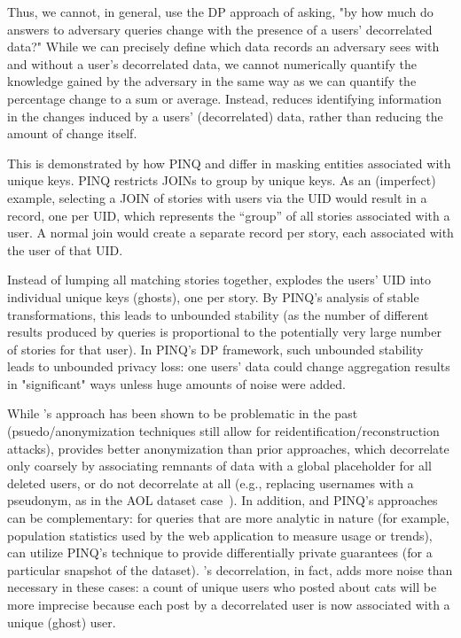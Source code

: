 Thus, we cannot, in general, use the DP approach of asking, "by how much do answers to adversary
queries change with the presence of a users' decorrelated data?" While we can precisely define which
data records an adversary sees with and without a user's decorrelated data, we cannot numerically
quantify the knowledge gained by the adversary in the same way as we can quantify the percentage
change to a sum or average.
Instead, \sys{} reduces identifying information in the changes induced by a users' (decorrelated)
data, rather than reducing the amount of change itself.

This is demonstrated by how PINQ and \sys{} differ in masking entities associated with unique keys.
PINQ restricts JOINs to group by unique keys. As an (imperfect) example, selecting a JOIN of stories
with users via the UID would result in a record, one per UID, which represents the ``group'' of all
stories associated with a user. A normal join would create a separate record per story, each
associated with the user of that UID.

Instead of lumping all matching stories together, \sys{} explodes the users' UID into individual
unique keys (ghosts), one per story. By PINQ's analysis of stable transformations, this leads to
unbounded stability (as the number of different results produced by queries is proportional to the
potentially very large number of stories for that user). In PINQ's DP framework, such unbounded
stability leads to unbounded privacy loss: one users' data could change aggregation results in
"significant" ways unless huge amounts of noise were added. 

While \sys{}'s approach has been shown to be problematic in the past (psuedo/anonymization
techniques still allow for reidentification/reconstruction attacks), \sys{} provides better
anonymization than prior approaches, which decorrelate only coarsely by associating remnants of data
with a global placeholder for all deleted users, or do not decorrelate at all (e.g., replacing
usernames with a pseudonym, as in the AOL dataset case~\cite{aol}). In addition, \sys{} and PINQ's
approaches can be complementary: for queries that are more analytic in nature (for example,
population statistics used by the web application to measure usage or trends), \sys{} can utilize
PINQ's technique to provide differentially private guarantees (for a particular snapshot of the
dataset).  \sys{}'s decorrelation, in fact, adds more noise than necessary in these cases: a count
of unique users who posted about cats will be more imprecise because each post by a decorrelated
user is now associated with a unique (ghost) user.

